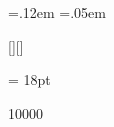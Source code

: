 \usepackage{fancyhdr} %
\usepackage[margin=1.0in]{geometry} %
\usepackage{setspace} %

\usepackage{cite} %

\usepackage{graphicx}

\usepackage{floatrow} %

\usepackage{booktabs} %

\usepackage{amssymb} %

\renewcommand{\arraystretch}{1.2} %
\setlength{\tabcolsep}{10pt}	  %
\newdimen\heavyrulewidth
\newdimen\lightrulewidth
\heavyrulewidth=.12em  %
\lightrulewidth=.05em  %


[][\FBwidth]

\usepackage[pdftex]{hyperref} %

\hypersetup{
	colorlinks,
	allcolors=black
}

\newcommand{\e}[1]{\times10^{#1}}

\headheight = 18pt

 10000
\raggedbottom